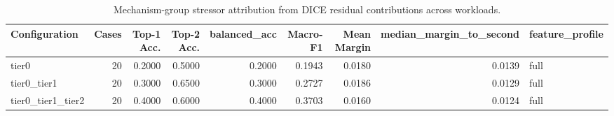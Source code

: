 \begin{table}[t]
\centering
\caption{Mechanism-group stressor attribution from DICE residual contributions across workloads.}
\label{tab:dice_stressor_diagnosis}
\footnotesize
\begin{tabular}{lrrrrrrrl}
\toprule
Configuration & Cases & Top-1 Acc. & Top-2 Acc. & balanced_acc & Macro-F1 & Mean Margin & median_margin_to_second & feature_profile \\
\midrule
tier0 & 20 & 0.2000 & 0.5000 & 0.2000 & 0.1943 & 0.0180 & 0.0139 & full \\
tier0_tier1 & 20 & 0.3000 & 0.6500 & 0.3000 & 0.2727 & 0.0186 & 0.0129 & full \\
tier0_tier1_tier2 & 20 & 0.4000 & 0.6000 & 0.4000 & 0.3703 & 0.0160 & 0.0124 & full \\
\bottomrule
\end{tabular}

\end{table}
